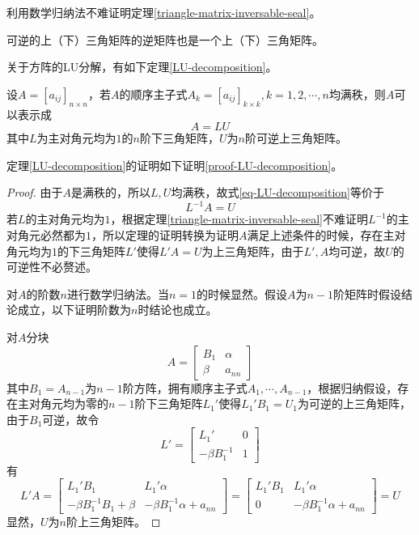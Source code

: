 利用数学归纳法不难证明定理\ref{triangle-matrix-inversable-seal}。

\begin{thm}
    \label{triangle-matrix-inversable-seal}
    可逆的上（下）三角矩阵的逆矩阵也是一个上（下）三角矩阵。
\end{thm}

关于方阵的LU分解，有如下定理\ref{LU-decomposition}。

\begin{thm}
    \label{LU-decomposition}
    设$A=[a_{ij}]_{n\times n}$，若$A$的顺序主子式$A_k=[a_{ij}]_{k\times k},k=1,2,\cdots,n$均满秩，则$A$可以表示成
    \begin{equation}
        A=LU\label{eq-LU-decomposition}
    \end{equation}
    其中$L$为主对角元均为$1$的$n$阶下三角矩阵，$U$为$n$阶可逆上三角矩阵。
\end{thm}

定理\ref{LU-decomposition}的证明如下证明\ref{proof-LU-decomposition}。

\begin{proof}
    \label{proof-LU-decomposition}
    由于$A$是满秩的，所以$L,U$均满秩，故式\ref{eq-LU-decomposition}等价于
    \[
        L^{-1}A=U
    \]
    若$L$的主对角元均为$1$，根据定理\ref{triangle-matrix-inversable-seal}不难证明$L^{-1}$的主对角元必然都为$1$，所以定理的证明转换为证明$A$满足上述条件的时候，存在主对角元均为$1$的下三角矩阵$L'$使得$L'A=U$为上三角矩阵，由于$L',A$均可逆，故$U$的可逆性不必赘述。

    对$A$的阶数$n$进行数学归纳法。当$n=1$的时候显然。假设$A$为$n-1$阶矩阵时假设结论成立，以下证明阶数为$n$时结论也成立。

    对$A$分块
    \[
        A=\begin{bmatrix}
            B_1 & \alpha \\ \beta & a_{nn}
        \end{bmatrix}
    \]
    其中$B_1=A_{n-1}$为$n-1$阶方阵，拥有顺序主子式$A_1,\cdots,A_{n-1}$，根据归纳假设，存在主对角元均为零的$n-1$阶下三角矩阵$L_1'$使得$L_1'B_1=U_1$为可逆的上三角矩阵，由于$B_1$可逆，故令
    \[
        L'=\begin{bmatrix}
            L_1' & 0 \\ -\beta B_1^{-1} & 1
        \end{bmatrix}
    \]
    有
    \[
        L'A=\begin{bmatrix}
            L_1'B_1 & L_1'\alpha \\
            -\beta B_1^{-1}B_1+\beta & -\beta B_1^{-1}\alpha+a_{nn}
        \end{bmatrix}=\begin{bmatrix}
            L_1'B_1 & L_1'\alpha \\
            0 & -\beta B_1^{-1}\alpha+a_{nn}
        \end{bmatrix}=U
    \]
    显然，$U$为$n$阶上三角矩阵。
\end{proof}
